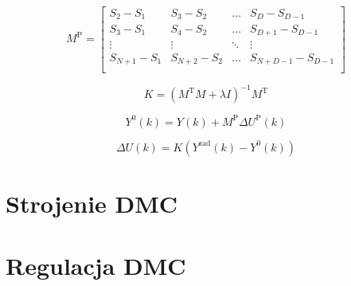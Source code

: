 \begin{equation}
	M^{\text{P}} = 
	\begin{bmatrix}
		S_2-S_1 & S_3-S_2 & \hdots & S_D-S_{D-1} \\
		S_3-S_1 & S_4-S_2 & \hdots & S_{D+1}-S_{D-1} \\
		\vdots & \vdots & \ddots & \vdots \\
		S_{N+1}-S_1 & S_{N+2}-S_2 & \hdots & S_{N+D-1}-S_{D-1} \\
	\end{bmatrix}
\end{equation}

\begin{equation}
	K = (M^{\textrm{T}}M+\lambda I)^{-1}M^{\textrm{T}} 
\end{equation}

\begin{equation}
	Y^\textrm{0}(k) = Y(k)+M^{\textrm{P}} \Delta U^{\textrm{P}}(k)
\end{equation}

\begin{equation}
	\Delta U(k) = K( Y^{\textrm{zad}}(k) - Y^\textrm{0}(k) )
\end{equation}

\section{Strojenie DMC}

\section{Regulacja DMC}